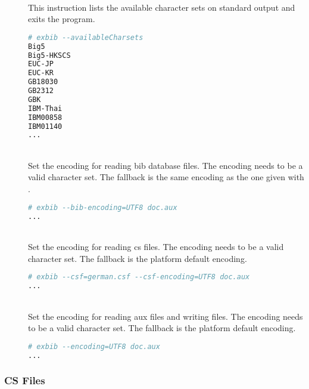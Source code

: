 \begin{description}
\item[]\ \\
  This instruction lists the available character sets on standard
  output and exits the program.
\begin{lstlisting}[language=sh]
# exbib --availableCharsets
Big5
Big5-HKSCS
EUC-JP
EUC-KR
GB18030
GB2312
GBK
IBM-Thai
IBM00858
IBM01140
...
\end{lstlisting}

\item[ ]
\item[ ]
\item[ ]\ \\
  Set the encoding for reading bib database files. The encoding needs
  to be a valid character set. The fallback is the same encoding as
  the one given with .
\begin{lstlisting}[language=sh]
# exbib --bib-encoding=UTF8 doc.aux
...
\end{lstlisting}

\item[ ]
\item[ ]\ \\
  Set the encoding for reading cs files. The encoding needs to be a
  valid character set. The fallback is the platform default encoding.
\begin{lstlisting}[language=sh]
# exbib --csf=german.csf --csf-encoding=UTF8 doc.aux
...
\end{lstlisting}

\item[ ]
\item[ ]\ \\
  Set the encoding for reading aux files and writing files. The
  encoding needs to be a valid character set. The fallback is the
  platform default encoding.
\begin{lstlisting}[language=sh]
# exbib --encoding=UTF8 doc.aux
...
\end{lstlisting}

\end{description}

\subsubsection{CS Files}%

